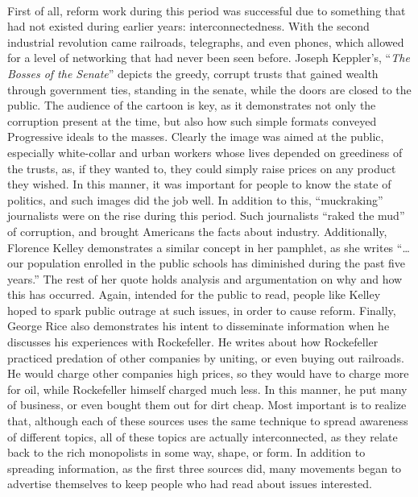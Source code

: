 \documentclass[12pt]{article}
\begin{document}
\paragraph{} First of all, reform work during this period was successful due to something that had not existed during earlier years: interconnectedness. With the second industrial revolution came railroads, telegraphs, and even phones, which allowed for a level of networking that had never been seen before. Joseph Keppler's, ``\textit{The Bosses of the Senate}'' depicts the greedy, corrupt trusts that gained wealth through government ties, standing in the senate, while the doors are closed to the public. The audience of the cartoon is key, as it demonstrates not only the corruption present at the time, but also how such simple formats conveyed Progressive ideals to the masses. Clearly the image was aimed at the public, especially white-collar and urban workers whose lives depended on greediness of the trusts, as, if they wanted to, they could simply raise prices on any product they wished. In this manner, it was important for people to know the state of politics, and such images did the job well. In addition to this, ``muckraking'' journalists were on the rise during this period. Such journalists ``raked the mud'' of corruption, and brought Americans the facts about industry. Additionally, Florence Kelley demonstrates a similar concept in her pamphlet, as she writes ``\dots our population enrolled in the public schools has diminished during the past five years.'' The rest of her quote holds analysis and argumentation on why and how this has occurred. Again, intended for the public to read, people like Kelley hoped to spark public outrage at such issues, in order to cause reform. Finally, George Rice also demonstrates his intent to disseminate information when he discusses his experiences with Rockefeller. He writes about how Rockefeller practiced predation of other companies by uniting, or even buying out railroads. He would charge other companies high prices, so they would have to charge more for oil, while Rockefeller himself charged much less. In this manner, he put many of business, or even bought them out for dirt cheap. Most important is to realize that, although each of these sources uses the same technique to spread awareness of different topics, all of these topics are actually interconnected, as they relate back to the rich monopolists in some way, shape, or form. In addition to spreading information, as the first three sources did, many movements began to advertise themselves to keep people who had read about issues interested.
\end{document}
